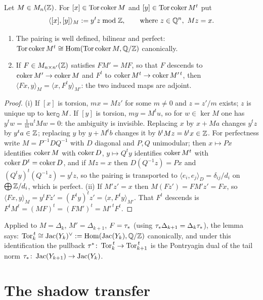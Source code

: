 \begin{lemma}\label{VIII:lem:dual}
Let $M\in M_n(\mathbb{Z})$. For $[x]\in\operatorname{Tor}\operatorname{coker} M$ and $[y]\in\operatorname{Tor}\operatorname{coker} M^{t}$ put
\[
\langle[x],[y]\rangle_M:=y^{t}z\bmod\mathbb{Z},\qquad\text{where } z\in\mathbb{Q}^n,\ Mz=x .
\]
\begin{enumerate}
\item[(i)] The pairing is well defined, bilinear and perfect:
$\operatorname{Tor}\operatorname{coker} M^{t}\cong\operatorname{Hom}(\operatorname{Tor}\operatorname{coker} M,\mathbb{Q}/\mathbb{Z})$ canonically.
\item[(ii)] If $F\in M_{n\times n'}(\mathbb{Z})$ satisfies $FM'=MF$, so that $F$ descends to
$\operatorname{coker} M'\to\operatorname{coker} M$ and $F^{t}$ to $\operatorname{coker} M^{t}\to\operatorname{coker} M'^{\,t}$, then
$\langle Fx,y\rangle_M=\langle x,F^{t}y\rangle_{M'}$: the two induced maps are adjoint.
\end{enumerate}
\end{lemma}

\begin{proof}
(i) If $[x]$ is torsion, $mx=Mz'$ for some $m\ne0$ and $z=z'/m$ exists; $z$ is unique
up to $\ker_{\mathbb{Q}} M$. If $[y]$ is torsion, $my=M^{t}u$, so for $w\in\ker M$ one has
$y^{t}w=\frac1m u^{t}Mw=0$: the ambiguity is invisible. Replacing $x$ by $x+Ma$ changes
$y^{t}z$ by $y^{t}a\in\mathbb{Z}$; replacing $y$ by $y+M^{t}b$ changes it by $b^{t}Mz=b^{t}x\in\mathbb{Z}$.
For perfectness write $M=P^{-1}DQ^{-1}$ with $D$ diagonal and $P,Q$ unimodular; then
$x\mapsto Px$ identifies $\operatorname{coker} M$ with $\operatorname{coker} D$, $y\mapsto Q^{t}y$ identifies
$\operatorname{coker} M^{t}$ with $\operatorname{coker} D^{t}=\operatorname{coker} D$, and if $Mz=x$ then $D(Q^{-1}z)=Px$ and
$(Q^{t}y)^{t}(Q^{-1}z)=y^{t}z$, so the pairing is transported to
$\langle e_i,e_j\rangle_D=\delta_{ij}/d_i$ on $\bigoplus\mathbb{Z}/d_i$, which is perfect.
(ii) If $M'z'=x$ then $M(Fz')=FM'z'=Fx$, so $\langle Fx,y\rangle_M=y^{t}Fz'=
(F^{t}y)^{t}z'=\langle x,F^{t}y\rangle_{M'}$. That $F^{t}$ descends is
$F^{t}M^{t}=(MF)^{t}=(FM')^{t}=M'^{\,t}F^{t}$.
\end{proof}

Applied to $M=\Delta_k$, $M'=\Delta_{k+1}$, $F=\tau_*$ (using $\tau_*\Delta_{k+1}=\Delta_k\tau_*$),
the lemma says: $\operatorname{Tor}_k^{\,t}\cong\operatorname{Jac}(Y_k)^{\vee}:=\operatorname{Hom}(\operatorname{Jac}(Y_k),\mathbb{Q}/\mathbb{Z})$ canonically,
and under this identification the pullback $\tau^*\colon\operatorname{Tor}_k^{\,t}\to\operatorname{Tor}_{k+1}^{\,t}$
is the Pontryagin dual of the tail norm $\tau_*\colon\operatorname{Jac}(Y_{k+1})\to\operatorname{Jac}(Y_k)$.

\section{The shadow transfer}\label{VIII:sec:transfer}

